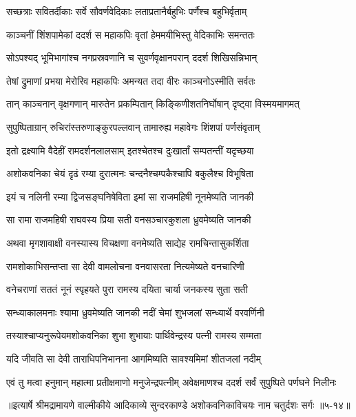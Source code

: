 \twolineshloka
{सच्छत्राः सवितर्दीकाः सर्वे सौवर्णवेदिकाः}
{लताप्रतानैर्बहुभिः पर्णैश्च बहुभिर्वृताम्} %

\twolineshloka
{काञ्चनीं शिंशपामेकां ददर्श स महाकपिः}
{वृतां हेममयीभिस्तु वेदिकाभिः समन्ततः} %

\twolineshloka
{सोऽपश्यद् भूमिभागांश्च नगप्रस्रवणानि च}
{सुवर्णवृक्षानपरान् ददर्श शिखिसन्निभान्} %

\twolineshloka
{तेषां द्रुमाणां प्रभया मेरोरिव महाकपिः}
{अमन्यत तदा वीरः काञ्चनोऽस्मीति सर्वतः} %

\twolineshloka
{तान् काञ्चनान् वृक्षगणान् मारुतेन प्रकम्पितान्}
{किङ्किणीशतनिर्घोषान् दृष्ट्वा विस्मयमागमत्} %

\twolineshloka
{सुपुष्पिताग्रान् रुचिरांस्तरुणाङ्कुरपल्लवान्}
{तामारुह्य महावेगः शिंशपां पर्णसंवृताम्} %

\twolineshloka
{इतो द्रक्ष्यामि वैदेहीं रामदर्शनलालसाम्}
{इतश्चेतश्च दुःखार्तां सम्पतन्तीं यदृच्छया} %

\twolineshloka
{अशोकवनिका चेयं दृढं रम्या दुरात्मनः}
{चन्दनैश्चम्पकैश्चापि बकुलैश्च विभूषिता} %

\twolineshloka
{इयं च नलिनी रम्या द्विजसङ्घनिषेविता}
{इमां सा राजमहिषी नूनमेष्यति जानकी} %

\twolineshloka
{सा रामा राजमहिषी राघवस्य प्रिया सती}
{वनसञ्चारकुशला ध्रुवमेष्यति जानकी} %

\twolineshloka
{अथवा मृगशावाक्षी वनस्यास्य विचक्षणा}
{वनमेष्यति साद्येह रामचिन्तासुकर्शिता} %

\twolineshloka
{रामशोकाभिसन्तप्ता सा देवी वामलोचना}
{वनवासरता नित्यमेष्यते वनचारिणी} %

\twolineshloka
{वनेचराणां सततं नूनं स्पृहयते पुरा}
{रामस्य दयिता चार्या जनकस्य सुता सती} %

\twolineshloka
{सन्ध्याकालमनाः श्यामा ध्रुवमेष्यति जानकी}
{नदीं चेमां शुभजलां सन्ध्यार्थे वरवर्णिनी} %

\twolineshloka
{तस्याश्चाप्यनुरूपेयमशोकवनिका शुभा}
{शुभायाः पार्थिवेन्द्रस्य पत्नी रामस्य सम्मता} %

\twolineshloka
{यदि जीवति सा देवी ताराधिपनिभानना}
{आगमिष्यति सावश्यमिमां शीतजलां नदीम्} %

\twolineshloka
{एवं तु मत्वा हनुमान् महात्मा प्रतीक्षमाणो मनुजेन्द्रपत्नीम्}
{अवेक्षमाणश्च ददर्श सर्वं सुपुष्पिते पर्णघने निलीनः} %


॥इत्यार्षे श्रीमद्रामायणे वाल्मीकीये आदिकाव्ये सुन्दरकाण्डे अशोकवनिकाविचयः नाम चतुर्दशः सर्गः ॥५-१४॥
